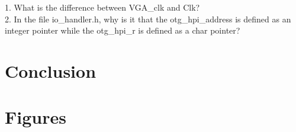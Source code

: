 \documentclass[journal, twocolumn, final,11pt,letterpaper]{IEEEtran}
\begin{document}
1. What is the difference between VGA\_clk and Clk? \\

2. In the file io\_handler.h, why is it that the otg\_hpi\_address is defined as an integer pointer while the otg\_hpi\_r is defined as a char pointer? \\

\section{Conclusion}

\clearpage
\onecolumn
\section{Figures}



\end{document}
